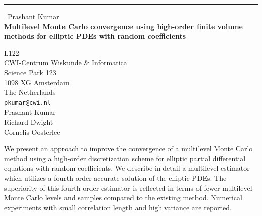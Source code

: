 \documentclass{report}
\begin{document}
\begin{center}
\rule{6in}{1pt} \
{\large Prashant Kumar \\
{\bf Multilevel Monte Carlo convergence using high-order finite volume methods for elliptic PDEs with random coefficients}}

L122 \\ CWI-Centrum Wiskunde \& Informatica \\ Science Park 123 \\ 1098 XG Amsterdam \\ The Netherlands
\\
{\tt pkumar@cwi.nl}\\
Prashant Kumar\\
Richard Dwight\\
Cornelis Oosterlee\end{center}

We present an approach to improve the convergence of a multilevel Monte
Carlo method using a high-order discretization scheme for elliptic
partial differential equations with random coefficients. We describe in
detail a multilevel estimator which utilizes a fourth-order accurate
solution of the elliptic PDEs. The superiority of this fourth-order
estimator is reflected in terms of fewer multilevel Monte Carlo levels
and samples compared to the existing method. Numerical experiments with
small correlation length and high variance are reported.
\end{document}
